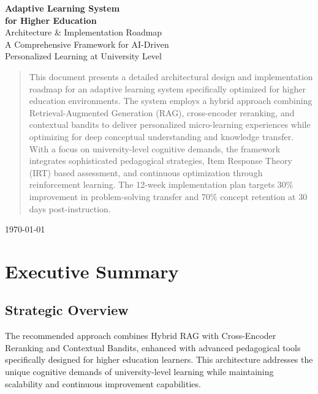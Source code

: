 \documentclass[11pt,a4paper]{report}
\begin{document}
\begin{titlepage}
    \centering
    \vspace*{2cm}
    {\Huge\bfseries\color{primaryblue} Adaptive Learning System\\[0.5cm]
    for Higher Education\\[1cm]}
    \Large{Architecture \& Implementation Roadmap}\\[2cm]
    
    \large{A Comprehensive Framework for AI-Driven\\
    Personalized Learning at University Level}\\[3cm]
    
    \begin{abstract}
    \noindent This document presents a detailed architectural design and implementation roadmap for an adaptive learning system specifically optimized for higher education environments. The system employs a hybrid approach combining Retrieval-Augmented Generation (RAG), cross-encoder reranking, and contextual bandits to deliver personalized micro-learning experiences while optimizing for deep conceptual understanding and knowledge transfer. With a focus on university-level cognitive demands, the framework integrates sophisticated pedagogical strategies, Item Response Theory (IRT) based assessment, and continuous optimization through reinforcement learning. The 12-week implementation plan targets 30\% improvement in problem-solving transfer and 70\% concept retention at 30 days post-instruction.
    \end{abstract}
    
    \vfill
    \today
\end{titlepage}

\tableofcontents
\newpage

\chapter{Executive Summary}

\section{Strategic Overview}

The recommended approach combines Hybrid RAG with Cross-Encoder Reranking and Contextual Bandits, enhanced with advanced pedagogical tools specifically designed for higher education learners. This architecture addresses the unique cognitive demands of university-level learning while maintaining scalability and continuous improvement capabilities.
\end{document}
